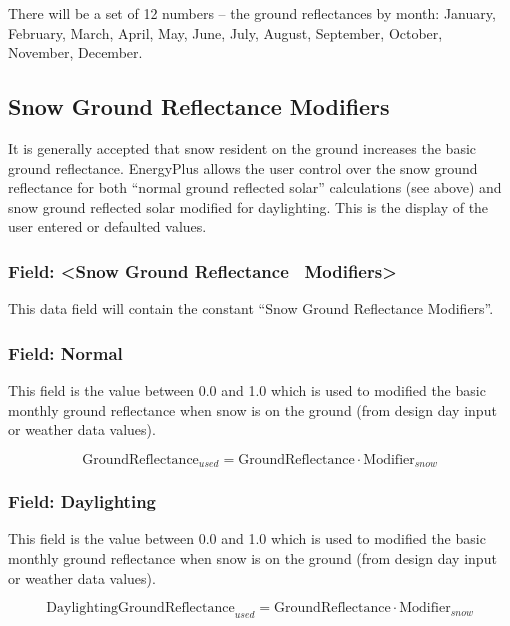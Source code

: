 There will be a set of 12 numbers -- the ground reflectances by month: January, February, March, April, May, June, July, August, September, October, November, December.

\subsection{Snow Ground Reflectance Modifiers}\label{snow-ground-reflectance-modifiers}

It is generally accepted that snow resident on the ground increases the basic ground reflectance. EnergyPlus allows the user control over the snow ground reflectance for both ``normal ground reflected solar'' calculations (see above) and snow ground reflected solar modified for daylighting. This is the display of the user entered or defaulted values.

\subsubsection{Field: \textless{}Snow Ground Reflectance~ Modifiers\textgreater{}}\label{field-snow-ground-reflectance-modifiers}

This data field will contain the constant ``Snow Ground Reflectance Modifiers''.

\subsubsection{Field: Normal}\label{field-normal}

This field is the value between 0.0 and 1.0 which is used to modified the basic monthly ground reflectance when snow is on the ground (from design day input or weather data values).

\begin{equation}
\text{GroundReflectance}_{used} = \text{GroundReflectance} \cdot \text{Modifier}_{snow}
\end{equation}

\subsubsection{Field: Daylighting}\label{field-daylighting}

This field is the value between 0.0 and 1.0 which is used to modified the basic monthly ground reflectance when snow is on the ground (from design day input or weather data values).

\begin{equation}
\text{DaylightingGroundReflectance}_{used} = \text{GroundReflectance} \cdot \text{Modifier}_{snow}
\end{equation}

